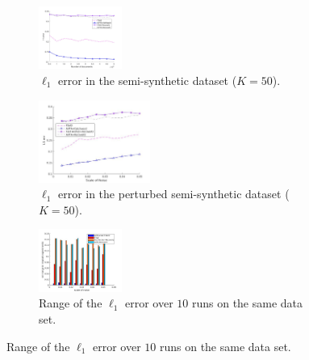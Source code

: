\documentclass[]{article}
\begin{document}
	\begin{figure}[!ht]
		\centering
		
		\begin{subfigure}{0.60\textwidth}
			\centering
			\includegraphics[width=0.3\textwidth]{Diff_number_of_doc}
			\caption{$\ell_1$ error in the semi-synthetic dataset ($K=50$).}
			\label{fig:semi-synthetic}
		\end{subfigure}%
		\begin{subfigure}{0.45\textwidth}
			\centering
			\includegraphics[width=0.4\textwidth]{err_diff_scale_noise}
			\caption{$\ell_1$ error in the perturbed semi-synthetic dataset ($K=50$).}
			\label{fig:semi-synthetic-noise}
		\end{subfigure}%
		
		\begin{subfigure}{0.55\textwidth}
			\centering
			\includegraphics[width=0.3\textwidth]{range_diff_scale_noise.jpg}
			\caption{Range of the $\ell_1$ error over $10$ runs on the same data set.}
			\label{fig:err_range}
		\end{subfigure}%
	\end{figure}
\end{document}
